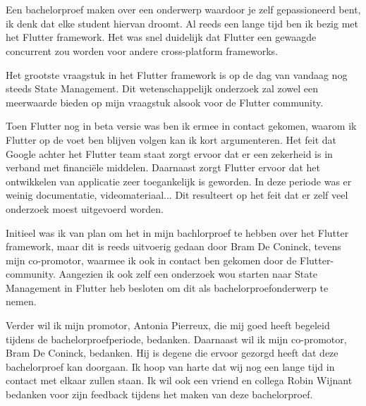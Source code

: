 
\chapter*{}
\label{ch:voorwoord}

Een bachelorproef maken over een onderwerp waardoor je zelf gepassioneerd bent, 
ik denk dat elke student hiervan droomt. Al reeds een lange tijd ben ik bezig met 
het Flutter framework. Het was snel duidelijk dat Flutter een gewaagde concurrent zou worden voor andere cross-platform frameworks.

Het grootste vraagstuk in het Flutter framework is op de dag van vandaag nog steeds State Management.
Dit wetenschappelijk onderzoek zal zowel een meerwaarde bieden op mijn vraagstuk alsook voor de Flutter community.

Toen Flutter nog in beta versie was ben ik ermee in contact gekomen, waarom ik Flutter op de voet ben blijven volgen kan ik kort argumenteren. Het feit dat Google achter het Flutter team staat zorgt ervoor dat er een zekerheid is in verband met financiële middelen. Daarnaast zorgt Flutter ervoor dat het ontwikkelen van applicatie zeer toegankelijk is geworden. In deze periode was er weinig documentatie, videomateriaal... Dit resulteert op het feit dat er zelf veel onderzoek moest uitgevoerd worden.

Initieel was ik van plan om het in mijn bachlorproef te hebben over het Flutter framework, maar dit is reeds uitvoerig gedaan door Bram De Coninck, tevens mijn co-promotor, waarmee ik ook in contact ben gekomen door de Flutter-community. Aangezien ik ook zelf een onderzoek wou starten naar State Management in Flutter heb besloten om dit als bachelorproefonderwerp te nemen.


Verder wil ik mijn promotor, Antonia Pierreux, die mij goed heeft begeleid tijdens de bachelorproefperiode, bedanken.
Daarnaast wil ik mijn co-promotor, Bram De Coninck, bedanken. Hij is degene die ervoor gezorgd heeft dat deze bachelorproef kan doorgaan. Ik hoop van harte dat wij nog een lange tijd in contact met elkaar zullen staan. Ik wil ook een vriend en collega Robin Wijnant bedanken voor zijn feedback tijdens het maken van deze bachelorproef.

